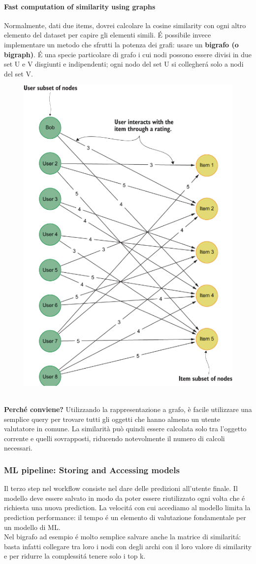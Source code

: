 \paragraph{Fast computation of similarity using graphs} Normalmente, dati due items, dovrei calcolare la cosine similarity con ogni altro elemento del dataset per capire gli elementi simili. É possibile invece implementare un metodo che sfrutti la potenza dei grafi: usare un \textbf{bigrafo (o bigraph)}. É una specie particolare di grafo i cui nodi possono essere divisi in due set U e V disgiunti e indipendenti; ogni nodo del set U si collegherá solo a nodi del set V. 
\\
\begin{figure}[th]
    \centering
    \includegraphics[width=0.4\linewidth]{ML&Graphs//img/bigraph.png}
\end{figure}
\\
\textbf{Perché conviene?} Utilizzando la rappresentazione a grafo, è facile utilizzare una semplice query per trovare tutti gli oggetti che hanno almeno un utente valutatore in comune. La similarità può quindi essere calcolata solo tra l'oggetto corrente e quelli sovrapposti, riducendo notevolmente il numero di calcoli necessari.

\subsubsection*{ML pipeline: Storing and Accessing models}
Il terzo step nel workflow consiste nel dare delle predizioni all'utente finale. Il modello deve essere salvato in modo da poter essere riutilizzato ogni volta che é richiesta una nuova prediction. La velocitá con cui accediamo al modello limita la prediction performance: il tempo é un elemento di valutazione fondamentale per un modello di ML. 
\\
Nel bigrafo ad esempio é molto semplice salvare anche la matrice di similaritá: basta infatti collegare tra loro i nodi con degli archi con il loro valore di similarity e per ridurre la complessitá tenere solo i top k.

